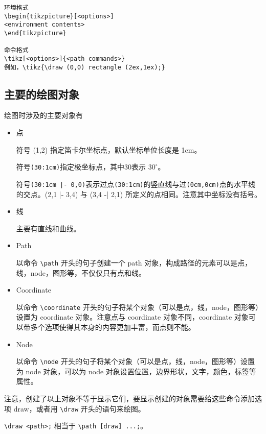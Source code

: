 \documentclass[UTF8]{ctexart}
\begin{document}
\begin{lstlisting}
环境格式
\begin{tikzpicture}[<options>]
<environment contents>
\end{tikzpicture}

命令格式
\tikz[<options>]{<path commands>}
例如，\tikz{\draw (0,0) rectangle (2ex,1ex);}
\end{lstlisting}



\subsection{主要的绘图对象}

绘图时涉及的主要对象有
\begin{itemize}
\item 点

符号 (1,2) 指定笛卡尔坐标点，默认坐标单位长度是 1cm。

符号\verb=(30:1cm)=指定极坐标点，其中30表示 $30^{\circ}$。

符号\verb=(30:1cm |- 0,0)=表示过点\verb=(30:1cm)=的竖直线与过\verb=(0cm,0cm)=点的水平线的交点。(2,1 |- 3,4) 与 (3,4 -| 2,1) 所定义的点相同。注意其中坐标没有括号。

\item 线

主要有直线和曲线。

\item Path

以命令 \verb!\path! 开头的句子创建一个 path 对象，构成路径的元素可以是点，线，node，图形等，不仅仅只有点和线。

\item Coordinate

以命令 \verb!\coordinate! 开头的句子将某个对象（可以是点，线，node，图形等）设置为 coordinate 对象。注意点与 coordinate 对象不同，coordinate 对象可以带多个选项使得其本身的内容更加丰富，而点则不能。

\item Node

以命令 \verb!\node! 开头的句子将某个对象（可以是点，线，node，图形等）设置为 node 对象，可以为 node 对象设置位置，边界形状，文字，颜色，标签等属性。
\end{itemize}

注意，创建了以上对象不等于显示它们，要显示创建的对象需要给这些命令添加选项 draw，或者用 \verb!\draw! 开头的语句来绘图。

\verb!\draw <path>;! 相当于 \verb!\path [draw] ...;!。
\end{document}
